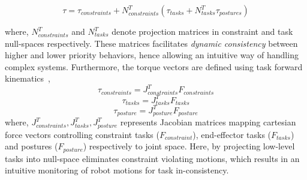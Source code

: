  \begin{equation}\label{eq:osf}
	 \tau = \tau_{constraints} + N^T_{constraints}(\tau_{tasks} + N^T_{tasks} \tau_{postures})
 \end{equation}
 
where, $N^T_{constraints}$ and $N^T_{tasks}$ denote projection matrices in constraint and task null-spaces respectively. These matrices facilitates \textit{dynamic consistency} between higher and lower priority behaviors, hence allowing an intuitive way of handling complex systems. Furthermore, the torque vectors are defined using task forward kinematics~\cite{sentis2006whole},
\begin{equation}
	\tau_{constraints} = J^T_{constraints} F_{constraints}
\end{equation} 
\begin{equation}
\tau_{tasks} = J^T_{tasks} F_{tasks}
\end{equation} 
\begin{equation}
\tau_{posture} = J^T_{posture} F_{posture}
\end{equation}
where, $J^T_{constraints},J^T_{tasks}, J^T_{posture}$ represents Jacobian matrices mapping cartesian force vectors controlling constraint tasks ($F_{constraint}$), end-effector tasks ($F_{tasks}$) and postures ($F_{posture}$) respectively to joint space. Here, by projecting low-level tasks into null-space eliminates constraint violating motions, which results in an intuitive monitoring of robot motions for task in-consistency.

% 
 



